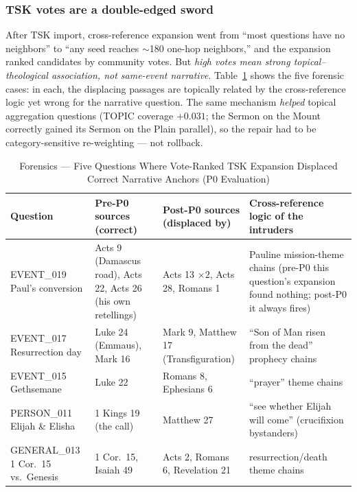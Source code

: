 \subsubsection{TSK votes are a double-edged sword}
After TSK import, cross-reference expansion went from ``most questions
have no neighbors'' to ``any seed reaches $\sim$180 one-hop neighbors,''
and the expansion ranked candidates by community votes. But \emph{high
votes mean strong topical--theological association, not same-event
narrative}. Table~\ref{tab:tskforensic} shows the five forensic cases:
in each, the displacing passages are topically related by the
cross-reference logic yet wrong for the narrative question. The same
mechanism \emph{helped} topical aggregation questions (TOPIC coverage
$+0.031$; the Sermon on the Mount correctly gained its Sermon on the
Plain parallel), so the repair had to be category-sensitive re-weighting
--- not rollback.

\begin{table}[!t]
\caption{Forensics --- Five Questions Where Vote-Ranked TSK Expansion
Displaced Correct Narrative Anchors (P0 Evaluation)}
\label{tab:tskforensic}
\centering
\begin{threeparttable}
\footnotesize
\begin{tabular}{@{}p{2.9cm}p{3.5cm}p{3.4cm}p{6.0cm}@{}}
\toprule
Question & Pre-P0 sources (correct) & Post-P0 sources (displaced by) &
Cross-reference logic of the intruders \\
\midrule
EVENT\_019 Paul's conversion & Acts 9 (Damascus road), Acts 22, Acts 26
(his own retellings) & Acts 13 $\times 2$, Acts 28, Romans 1 & Pauline
mission-theme chains (pre-P0 this question's expansion found nothing;
post-P0 it always fires) \\
EVENT\_017 Resurrection day & Luke 24 (Emmaus), Mark 16 & Mark 9,
Matthew 17 (Transfiguration) & ``Son of Man risen from the dead''
prophecy chains \\
EVENT\_015 Gethsemane & Luke 22 & Romans 8, Ephesians 6 & ``prayer''
theme chains \\
PERSON\_011 Elijah \& Elisha & 1 Kings 19 (the call) & Matthew 27 &
``see whether Elijah will come'' (crucifixion bystanders) \\
GENERAL\_013 1 Cor.\ 15 vs.\ Genesis & 1 Cor.\ 15, Isaiah 49 & Acts 2,
Romans 6, Revelation 21 & resurrection/death theme chains \\
\bottomrule
\end{tabular}
\end{threeparttable}
\end{table}

